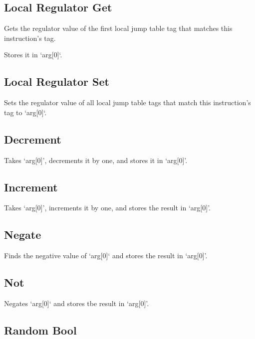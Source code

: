 \subsection{Local Regulator Get}


Gets the regulator value of the first local jump table tag that matches this instruction's tag.

Stores it in `arg[0]`.

\subsection{Local Regulator Set}


Sets the regulator value of all local jump table tags that match this instruction's tag to `arg[0]`.

\subsection{Decrement}


Takes `arg[0]', decrements it by one, and stores it in `arg[0]'.

\subsection{Increment}


Takes `arg[0]', increments it by one, and stores the result in `arg[0]'.

\subsection{Negate}


Finds the negative value of `arg[0]` and stores the result in `arg[0]'.

\subsection{Not}


Negates `arg[0]` and stores tbe result in `arg[0]'.

\subsection{Random Bool}

